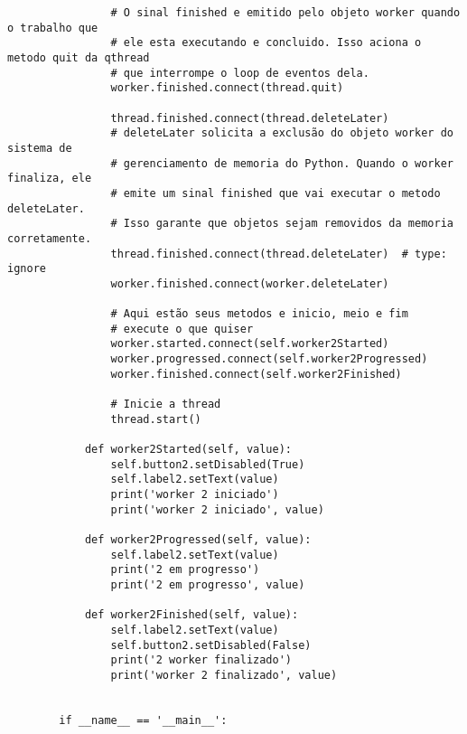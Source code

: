 \documentclass[12pt,a4paper]{article}
\begin{document}
\begin{lstlisting}
                # O sinal finished e emitido pelo objeto worker quando o trabalho que
                # ele esta executando e concluido. Isso aciona o metodo quit da qthread
                # que interrompe o loop de eventos dela.
                worker.finished.connect(thread.quit)
        
                thread.finished.connect(thread.deleteLater)
                # deleteLater solicita a exclusão do objeto worker do sistema de
                # gerenciamento de memoria do Python. Quando o worker finaliza, ele
                # emite um sinal finished que vai executar o metodo deleteLater.
                # Isso garante que objetos sejam removidos da memoria corretamente.
                thread.finished.connect(thread.deleteLater)  # type: ignore
                worker.finished.connect(worker.deleteLater)
        
                # Aqui estão seus metodos e inicio, meio e fim
                # execute o que quiser
                worker.started.connect(self.worker2Started)
                worker.progressed.connect(self.worker2Progressed)
                worker.finished.connect(self.worker2Finished)
        
                # Inicie a thread
                thread.start()
        
            def worker2Started(self, value):
                self.button2.setDisabled(True)
                self.label2.setText(value)
                print('worker 2 iniciado')
                print('worker 2 iniciado', value)
        
            def worker2Progressed(self, value):
                self.label2.setText(value)
                print('2 em progresso')
                print('2 em progresso', value)
        
            def worker2Finished(self, value):
                self.label2.setText(value)
                self.button2.setDisabled(False)
                print('2 worker finalizado')
                print('worker 2 finalizado', value)
        
        
        if __name__ == '__main__':
    \end{lstlisting}







    
\end{document}
